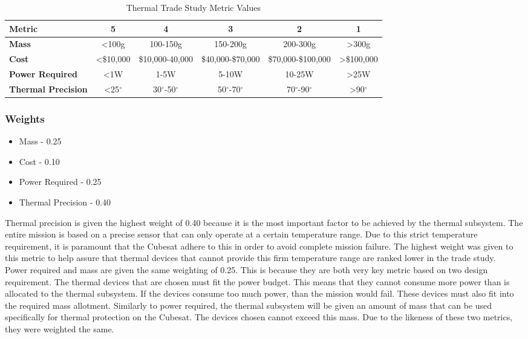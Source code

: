 \begin{table}[H]
\centering
\begin{tabular}{|l|c|c|c|c|c|} 
\hline
    \textbf{Metric} & \textbf{5} & \textbf{4} & \textbf{3} & \textbf{2} & \textbf{1}
    \\
\hline
    \textbf{Mass} & <100g & 100-150g & 150-200g & 200-300g & >300g 
    \\
\hline
    \textbf{Cost} & <\$10,000 & \$10,000-40,000 & \$40,000-\$70,000 & \$70,000-\$100,000 & >\$100,000
    \\
\hline
    \textbf{Power Required} & <1W & 1-5W & 5-10W & 10-25W & >25W 
    \\
\hline
    \textbf{Thermal Precision} & <25$^{\circ}$  & 30$^{\circ}$-50$^{\circ}$ & 50$^{\circ}$-70$^{\circ}$ & 70$^{\circ}$-90$^{\circ}$ & >90$^{\circ}$ 
    \\
\hline
\end{tabular}
\caption{Thermal Trade Study Metric Values}
\label{tbl:Thermal_Metric_Scores}
\end{table}

\subsubsection{Weights}

\begin{itemize}
    \item Mass - 0.25
    \item Cost - 0.10
    \item Power Required - 0.25
    \item Thermal Precision - 0.40
\end{itemize}

Thermal precision is given the highest weight of 0.40 because it is the most important factor to be achieved by the thermal subsystem.  The entire mission is based on a precise sensor that can only operate at a certain temperature range.  Due to this strict temperature requirement, it is paramount that the Cubesat adhere to this in order to avoid complete mission failure.  The highest weight was given to this metric to help assure that thermal devices that cannot provide this firm temperature range are ranked lower in the trade study.\\

Power required and mass are given the same weighting of 0.25.  This is because they are both very key metric based on two design requirement.  The thermal devices that are chosen must fit the power budget.  This means that they cannot consume more power than is allocated to the thermal subsystem.  If the devices consume too much power, than the mission would fail.  These devices must also fit into the required mass allotment.  Similarly to power required, the thermal subsystem will be given an amount of mass that can be used specifically for thermal protection on the Cubesat.  The devices chosen cannot exceed this mass.  Due to the likeness of these two metrics, they were weighted the same.\\

